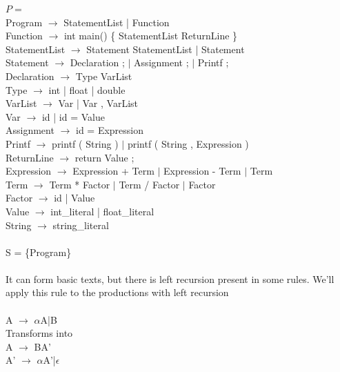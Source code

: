 \documentclass[letterpaper,12pt,oneside]{article}
\begin{document}
$P = $ \\
Program $\rightarrow$ StatementList | Function \\
Function $\rightarrow$ int main() \{ StatementList ReturnLine \} \\
StatementList $\rightarrow$ Statement StatementList | Statement \\
Statement $\rightarrow$ Declaration ; $|$ \hspace{0.5cm} Assignment ;   $|$ \hspace{0.5cm} Printf ;\\
Declaration $\rightarrow$ Type VarList \\
Type $\rightarrow$ int | float | double \\
VarList $\rightarrow$ Var | Var , VarList \\
Var $\rightarrow$ id | id = Value \\
Assignment $\rightarrow$ id = Expression \\
Printf $\rightarrow$ printf ( String ) $|$ \hspace{0.5cm} printf ( String , Expression ) \\
ReturnLine $\rightarrow$ return Value ; \\
Expression $\rightarrow$ Expression + Term $|$ \hspace{0.5cm} Expression - Term $|$ \hspace{0.5cm} Term \\
Term $\rightarrow$ Term * Factor $|$ \hspace{0.5cm} Term / Factor $|$ \hspace{0.5cm} Factor \\
Factor $\rightarrow$ id | Value \\
Value $\rightarrow$ int\_literal | float\_literal \\
String $\rightarrow$ string\_literal
\\ \\
S = \{Program\} \\\\

It can form basic texts, but there is left recursion present in some rules. We'll apply this rule to the productions with left recursion
\\\\
A $\rightarrow$ $\alpha$A|B \\
Transforms into \\
A $\rightarrow$ BA'\\
A' $\rightarrow$ $\alpha$A'|$\epsilon$\\
\end{document}
